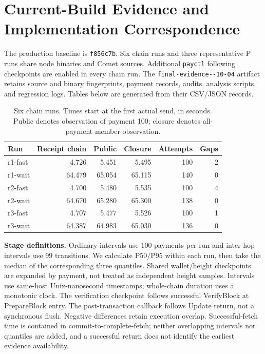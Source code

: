 \section{Current-Build Evidence and Implementation Correspondence}
\label{supp:final-evidence}
The production baseline is \texttt{f856c7b}. Six chain runs and three representative P runs share node binaries and Comet sources. Additional \texttt{payctl} following checkpoints are enabled in every chain run. The \texttt{final-\allowbreak evidence--10-04} artifact retains source and binary fingerprints, payment records, audits, analysis scripts, and regression logs. Tables below are generated from their CSV/JSON records.

\begin{table}[htbp]
\centering\small
\caption{Six chain runs. Times start at the first actual send, in seconds. Public denotes observation of payment 100; closure denotes all-payment member observation.}
\label{tab:final-evidence-chain}
\begin{tabular}{lrrrrr}\toprule
Run & Receipt chain & Public & Closure & Attempts & Gaps \\\midrule
r1-fast & 4.726 & 5.451 & 5.495 & 100 & 2 \\
r1-wait & 64.479 & 65.054 & 65.115 & 140 & 0 \\
r2-fast & 4.700 & 5.480 & 5.535 & 100 & 4 \\
r2-wait & 64.670 & 65.280 & 65.300 & 138 & 0 \\
r3-fast & 4.707 & 5.477 & 5.526 & 100 & 1 \\
r3-wait & 64.387 & 64.983 & 65.030 & 136 & 0 \\
\bottomrule\end{tabular}
\end{table}

\noindent\textbf{Stage definitions.} Ordinary intervals use 100 payments per run and inter-hop intervals use 99 transitions. We calculate P50/P95 within each run, then take the median of the corresponding three quantiles. Shared wallet/height checkpoints are expanded by payment, not treated as independent height samples. Intervals use same-host Unix-nanosecond timestamps; whole-chain duration uses a monotonic clock. The verification checkpoint follows successful VerifyBlock at PrepareBlock entry. The post-transaction callback follows Update return, not a synchronous flush. Negative differences retain execution overlap. Successful-fetch time is contained in commit-to-complete-fetch; neither overlapping intervals nor quantiles are added, and a successful return does not identify the earliest evidence availability.

